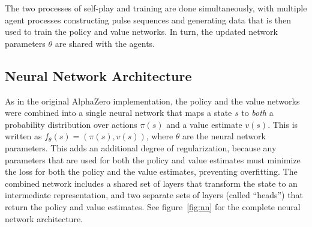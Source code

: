 The two processes of self-play and training are done simultaneously, with multiple agent processes constructing pulse sequences and generating data that is then used to train the policy and value networks. In turn, the updated network parameters $\theta$ are shared with the agents.



\subsection{Neural Network Architecture}

As in the original AlphaZero implementation, the policy and the value networks were combined into a single neural network that maps a state $s$ to \emph{both} a probability distribution over actions $\pi(s)$ and a value estimate $v(s)$. This is written as $f_\theta(s) = (\pi(s), v(s))$, where $\theta$ are the neural network parameters. This adds an additional degree of regularization, because any parameters that are used for both the policy and value estimates must minimize the loss for both the policy and the value estimates, preventing overfitting. The combined network includes a shared set of layers that transform the state to an intermediate representation, and two separate sets of layers (called ``heads'') that return the policy and value estimates. See figure~\ref{fig:nn} for the complete neural network architecture.

